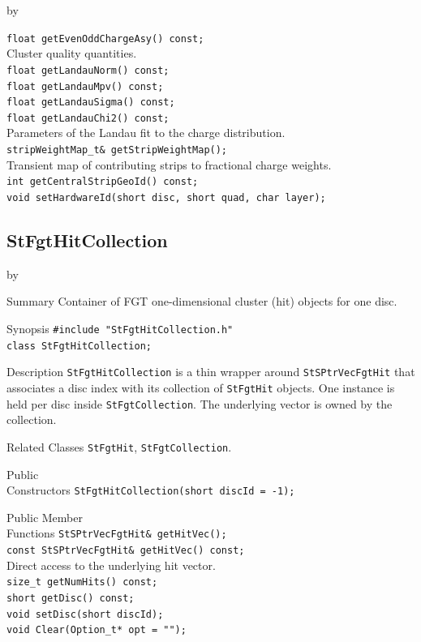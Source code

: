 \documentclass[twoside]{article}
\newcommand{\entrylabel}[1]{\mbox{\textbf{{#1}}}\hfil}%
\newenvironment{entry}
{\begin{list}{}%
    {\renewcommand{\makelabel}{\entrylabel}%
     \setlength{\labelwidth}{90pt}%
     \setlength{\leftmargin}{\labelwidth}
     \advance\leftmargin by \labelsep%
      }%
    }%
  {\end{list}}
\newcommand{\Entrylabel}[1]%
{\raisebox{0pt}[1ex][0pt]{\makebox[\labelwidth][l]%
    {\parbox[t]{\labelwidth}{\hspace{0pt}\textbf{{#1}}}}}}
\newenvironment{Entry}%
{\renewcommand{\entrylabel}{\Entrylabel}\begin{entry}}%
  {\end{entry}}
\begin{document}
\begin{Entry}
    \verb+float getEvenOddChargeAsy() const;+\\
    Cluster quality quantities.\\[2pt]
    \verb+float getLandauNorm() const;+\\
    \verb+float getLandauMpv() const;+\\
    \verb+float getLandauSigma() const;+\\
    \verb+float getLandauChi2() const;+\\
    Parameters of the Landau fit to the charge distribution.\\[2pt]
    \verb+stripWeightMap_t& getStripWeightMap();+\\
    Transient map of contributing strips to fractional charge weights.\\[2pt]
    \verb+int getCentralStripGeoId() const;+\\
    \verb+void setHardwareId(short disc, short quad, char layer);+\\
\end{Entry}
\clearpage

\subsection{StFgtHitCollection}
\label{sec:StFgtHitCollection}
\begin{Entry}
\item[Summary] Container of FGT one-dimensional cluster (hit) objects for one disc.
\item[Synopsis]
    \verb+#include "StFgtHitCollection.h"+\\
    \verb+class StFgtHitCollection;+\\
\item[Description]
  \texttt{StFgtHitCollection} is a thin wrapper around \texttt{StSPtrVecFgtHit} that
  associates a disc index with its collection of \texttt{StFgtHit} objects.  One instance
  is held per disc inside \texttt{StFgtCollection}.  The underlying vector is owned by
  the collection.
\item[Related Classes]
  \texttt{StFgtHit}, \texttt{StFgtCollection}.
\item[Public\\ Constructors]
    \verb+StFgtHitCollection(short discId = -1);+\\
\item[Public Member\\ Functions]
    \verb+StSPtrVecFgtHit& getHitVec();+\\
    \verb+const StSPtrVecFgtHit& getHitVec() const;+\\
    Direct access to the underlying hit vector.\\[2pt]
    \verb+size_t getNumHits() const;+\\
    \verb+short getDisc() const;+\\
    \verb+void setDisc(short discId);+\\
    \verb+void Clear(Option_t* opt = "");+\\
\end{Entry}
\clearpage
\end{document}
